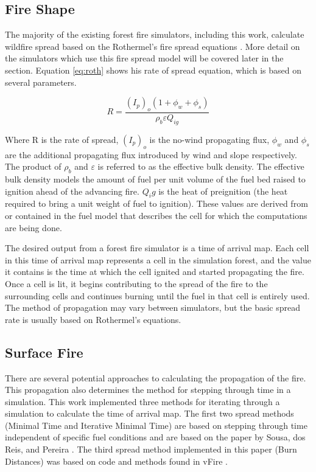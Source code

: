 \subsection{Fire Shape}
The majority of the existing forest fire simulators, including this work, calculate wildfire spread based on the Rothermel's fire spread equations \cite{roth}. More detail on the simulators which use this fire spread model will be covered later in the section. Equation \ref{eq:roth} shows his rate of spread equation, which is based on several parameters. 

\begin{equation} \label{eq:roth}
R = \frac{(I_{p})_{o}(1 + \phi_{w} + \phi_{s})}{\rho_{b}\varepsilon Q_{ig}}
\end{equation}

Where R is the rate of spread, $(I_p)_o$ is the no-wind propagating flux, $\phi_w$ and $\phi_s$ are the additional propagating flux introduced by wind and slope respectively. The product of $\rho_b$ and $\varepsilon$ is referred to as the effective bulk density. The effective bulk density models the amount of fuel per unit volume of the fuel bed raised to ignition ahead of the advancing fire. $Q_ig$ is the heat of preignition (the heat required to bring a unit weight of fuel to ignition). These values are derived from or contained in the fuel model that describes the cell for which the computations are being done. 

The desired output from a forest fire simulator is a time of arrival map. Each cell in this time of arrival map represents a cell in the simulation forest, and the value it contains is the time at which the cell ignited and started propagating the fire. Once a cell is lit, it begins contributing to the spread of the fire to the surrounding cells and continues burning until the fuel in that cell is entirely used. The method of propagation may vary between simulators, but the basic spread rate is usually based on Rothermel's equations.

\subsection{Surface Fire}
There are several potential approaches to calculating the propagation of the fire. This propagation also determines the method for stepping through time in a simulation. This work implemented three methods for iterating through a simulation to calculate the time of arrival map. The first two spread methods (Minimal Time and Iterative Minimal Time) are based on stepping through time independent of specific fuel conditions and are based on the paper by Sousa, dos Reis, and Pereira \cite{gpufire}. The third spread method implemented in this paper (Burn Distances) was based on code and methods found in vFire \cite{vFire}. 

